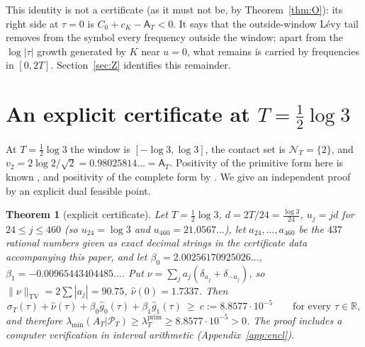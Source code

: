 \documentclass[11pt]{amsart}
\newtheorem{theorem}{Theorem}[section]
\theoremstyle{definition}
\theoremstyle{remark}
\newcommand{\R}{\mathbb R}
\newcommand{\TV}{\operatorname{TV}}
\newcommand{\PT}{\mathcal P_T}
\newcommand{\lamP}{\lambda^{\mathrm{prim}}_T}
\newcommand{\lamA}{\lambda_{\min}(A_T|\PT)}
\newcommand{\sT}{\sigma_T}
\newcommand{\gh}[1]{\widehat g_{#1}}
\newcommand{\nuh}{\widehat\nu}
\newcommand{\NT}{\mathcal N_T}
\newcommand{\Aconst}{\mathsf A_T}
\begin{document}
This identity is not a certificate (as it must not be, by Theorem~\ref{thm:O}): its right side at
$\tau=0$ is $C_0+c_K-\Aconst<0$. It says that the outside-window L\'evy tail removes from the symbol
every frequency outside the window; apart from the $\log|\tau|$ growth generated by $K$ near $u=0$,
what remains is carried by frequencies in $[0,2T]$. Section~\ref{sec:Z} identifies this remainder.

\section{An explicit certificate at \texorpdfstring{$T=\tfrac12\log3$}{T = (1/2) log 3}}\label{sec:cert}

At $T=\frac12\log3$ the window is $[-\log3,\log3]$, the contact set is $\NT=\{2\}$, and
$v_2=2\log2/\sqrt2=0.98025814\ldots=\Aconst$. Positivity of the primitive form here is known
\cite{Paper42}, and positivity of the complete form by \cite[Thm.~1.2]{Zhu2026}. We give an independent
proof by an explicit dual feasible point.

\begin{theorem}[explicit certificate]\label{thm:C}
Let $T=\frac12\log3$, $d=2T/24=\frac{\log3}{24}$,
$u_j=jd$ for $24\le j\le460$ (so $u_{24}=\log3$ and $u_{460}=21.0567\ldots$), let
$a_{24},\dots,a_{460}$ be the $437$ rational numbers given as exact decimal strings in the
certificate data accompanying this paper, and let
$\beta_0=2.00256170925026\ldots$, $\beta_1=-0.00965443404485\ldots$. Put
$\nu=\sum_ja_j(\delta_{u_j}+\delta_{-u_j})$, so $\|\nu\|_{\TV}=2\sum|a_j|=90.75$, $\nuh(0)=1.7337$.
Then
\[
\sT(\tau)+\nuh(\tau)+\beta_0\gh0(\tau)+\beta_1\gh1(\tau)\ \ge\ c:=8.8577\cdot10^{-5}\qquad\text{for every }\tau\in\R,
\]
and therefore $\lamA\ge\lamP\ge8.8577\cdot10^{-5}>0$. The proof includes a computer verification
in interval arithmetic (Appendix~\ref{app:encl}).
\end{theorem}
\end{document}
